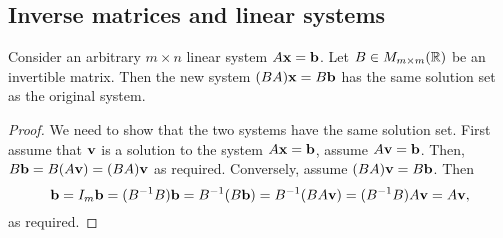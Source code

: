 \documentclass[10pt, a4paper]{article}
\begin{document}
\subsection{Inverse matrices and linear systems}
\begin{lemma}\label{pre:linalg:lem:solsetsam}
    Consider an arbitrary $m \times n$ linear system $A\mathbf{x} = \mathbf{b}$.
    Let $B \in M_{m \times m}(\mathbb{R})$ be an invertible matrix.
    Then the new system $(BA)\mathbf{x} = B\mathbf{b}$ has the same solution set as the original system.
    \begin{proof}
        We need to show that the two systems have the same solution set.
        First assume that $\mathbf{v}$ is a solution to the system $A\mathbf{x} = \mathbf{b}$, assume $A\mathbf{v} = \mathbf{b}$.
        Then, $B\mathbf{b} = B(A\mathbf{v}) = (BA)\mathbf{v}$ as required.
        Conversely, assume $(BA)\mathbf{v} = B\mathbf{b}$. Then
        \[
        \mathbf{b} = I_m\mathbf{b} = (B ^ {-1}B)\mathbf{b} = B ^ {-1}(B\mathbf{b}) = B ^ {-1}(BA\mathbf{v}) = (B ^ {-1} B) A\mathbf{v} = A\mathbf{v},
        \]
        as required.
    \end{proof}
\end{lemma}
\end{document}

